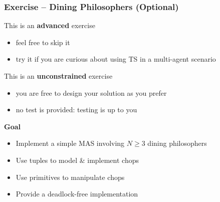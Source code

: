 \documentclass[presentation]{beamer}\mode<presentation>{\usetheme{AMSCesenaPurpleAndGold}}
\begin{document}
\begin{frame}[allowframebreaks]
	\frametitle{Exercise \currentExercise{} -- Dining Philosophers (Optional)}

	\begin{alertblock}{This is an \textbf{advanced} exercise}
		\begin{itemize}
			\item feel free to skip it
			\item try it if you are curious about using TS in a \alert{multi-}agent scenario
		\end{itemize}
	\end{alertblock}

	\bigskip

	\begin{alertblock}{This is an \textbf{unconstrained} exercise}
		\begin{itemize}
			\item you are free to design your solution as you prefer
			\item no test is provided: testing is up to you
		\end{itemize}
	\end{alertblock}

	\bigskip

	\begin{block}{\textbf{Goal}}
		\begin{itemize}
			\item Implement a simple MAS involving $N \geq 3$ \alert{dining philosophers}
			\item Use \linda{} tuples to model \& implement chops
			\item Use \linda{} primitives to manipulate chops
			\item Provide a \alert{deadlock-free} implementation
		\end{itemize}
	\end{block}

\end{frame}

\section*{}

\frame{\titlepage}
\end{document}
